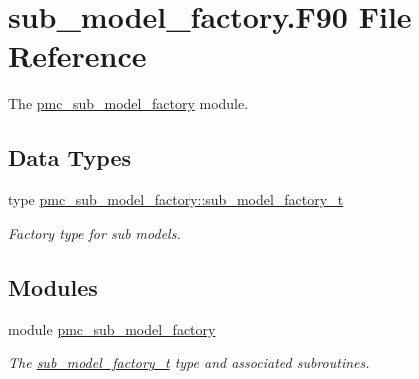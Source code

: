 \hypertarget{sub__model__factory_8_f90}{}\section{sub\+\_\+model\+\_\+factory.\+F90 File Reference}
\label{sub__model__factory_8_f90}


The \mbox{\hyperlink{namespacepmc__sub__model__factory}{pmc\+\_\+sub\+\_\+model\+\_\+factory}} module.  


\subsection*{Data Types}
\begin{DoxyCompactItemize}
\item 
type \mbox{\hyperlink{structpmc__sub__model__factory_1_1sub__model__factory__t}{pmc\+\_\+sub\+\_\+model\+\_\+factory\+::sub\+\_\+model\+\_\+factory\+\_\+t}}
\begin{DoxyCompactList}\small\item\em Factory type for sub models. \end{DoxyCompactList}\end{DoxyCompactItemize}
\subsection*{Modules}
\begin{DoxyCompactItemize}
\item 
module \mbox{\hyperlink{namespacepmc__sub__model__factory}{pmc\+\_\+sub\+\_\+model\+\_\+factory}}
\begin{DoxyCompactList}\small\item\em The \mbox{\hyperlink{structpmc__sub__model__factory_1_1sub__model__factory__t}{sub\+\_\+model\+\_\+factory\+\_\+t}} type and associated subroutines. \end{DoxyCompactList}\end{DoxyCompactItemize}
